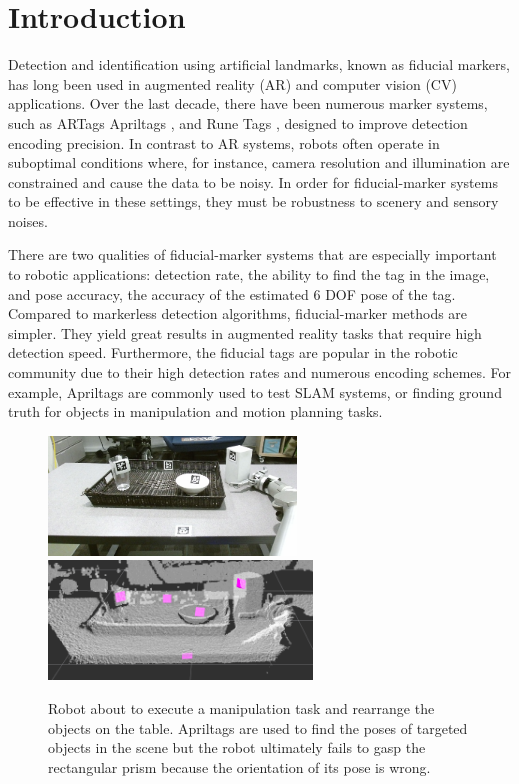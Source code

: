 \section{Introduction}
\label{sec:intro}

Detection and identification using artificial landmarks, known as fiducial markers, has long been used in augmented reality (AR) and computer vision (CV) applications. Over the last decade, there have been numerous marker systems, such as ARTags \citep{fiala2004artag} Apriltags \citep{olson2011apriltag}, and Rune Tags \citep{bergamasco2011rune}, designed to improve detection encoding precision. In contrast to AR systems, robots often operate in suboptimal conditions where, for instance, camera resolution and illumination are constrained and cause the data to be noisy. In order for fiducial-marker systems to be effective in these settings, they must be robustness to scenery and sensory noises.

	There are two qualities of fiducial-marker systems that are especially important to robotic applications: detection rate, the ability to find the tag in the image, and pose accuracy, the accuracy of the estimated 6 DOF pose of the tag. Compared to markerless detection algorithms, fiducial-marker methods are simpler. They yield great results in augmented reality tasks that require high detection speed. Furthermore, the fiducial tags are popular in the robotic community due to their high detection rates and numerous encoding schemes. For example, Apriltags are commonly used to test SLAM systems, or finding ground truth for objects in manipulation and motion planning tasks.  

\begin{figure}
\includegraphics[width=\columnwidth, height=120px]{figs/table_clearing_rgb_small} \\
\includegraphics[width=\columnwidth, height=120px]{figs/table_clearing_depth}
\caption{Robot about to execute a manipulation task and rearrange the objects on the table. Apriltags are used to find the poses of targeted objects in the scene but the robot ultimately fails to gasp the rectangular prism because the orientation of its pose is wrong.}
\label{fig:table_clearing}
\end{figure}

